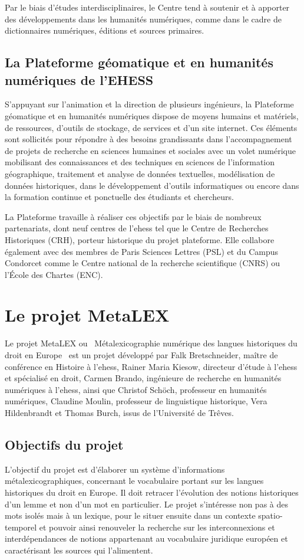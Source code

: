 Par le biais d'études interdisciplinaires, le Centre tend à soutenir et à apporter des développements dans les humanités numériques, comme dans le cadre de dictionnaires numériques, éditions et sources primaires. 

\subsection{La Plateforme géomatique et en humanités numériques de l'EHESS}
S’appuyant sur l’animation et la direction de plusieurs ingénieurs, la Plateforme géomatique et en humanités numériques dispose de moyens humains et matériels, de ressources, d’outils de stockage, de services et d’un site internet. Ces éléments sont sollicités pour répondre à des besoins grandissants dans l’accompagnement de projets de recherche en sciences humaines et sociales avec un volet numérique mobilisant des connaissances et des techniques en sciences de l'information géographique, traitement et analyse de données textuelles, modélisation de données historiques, dans le développement d’outils informatiques ou encore dans la formation continue et ponctuelle des étudiants et chercheurs.

La Plateforme travaille à réaliser ces objectifs par le biais de nombreux partenariats, dont neuf centres de l’\acrshort{ehess} tel que le Centre de Recherches Historiques (CRH), porteur historique du projet plateforme. Elle collabore également avec des membres de Paris Sciences Lettres (PSL) et du Campus Condorcet comme le Centre national de la recherche scientifique (CNRS) ou l’École des Chartes (ENC).

\section{Le projet MetaLEX}
Le projet MetaLEX ou \og~Métalexicographie numérique des langues historiques du droit en Europe~\fg{} est un projet développé par Falk Bretschneider, maître de conférence en Histoire à l'\acrshort{ehess}, Rainer Maria Kiesow, directeur d'étude à l'\acrshort{ehess} et spécialisé en droit, Carmen Brando, ingénieure de recherche en humanités numériques à l'\acrshort{ehess}, ainsi que Christof Schöch, professeur en humanités numériques, Claudine Moulin, professeur de linguistique historique, Vera Hildenbrandt et Thomas Burch, issus de l'Université de Trêves.

\subsection{Objectifs du projet}
L'objectif du projet est d'élaborer un système d'informations métalexicographiques, concernant le vocabulaire portant sur les langues historiques du droit en Europe. Il doit retracer l'évolution des notions historiques d'un lemme et non d'un mot en particulier. Le projet s'intéresse non pas à des mots isolés mais à un lexique, pour le situer ensuite dans un contexte spatio-temporel et pouvoir ainsi renouveler la recherche sur les interconnexions et interdépendances de notions appartenant au vocabulaire juridique européen et caractérisant les sources qui l'alimentent.

